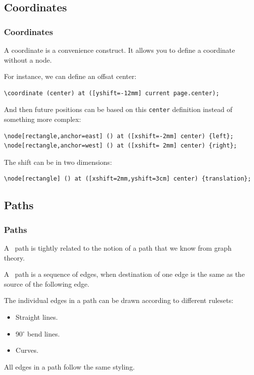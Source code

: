 \subsection{Coordinates}
\begin{frame}[fragile]
  \frametitle{Coordinates}
  \pause
  \vspace{3mm}
  A coordinate is a convenience construct. It allows you to define a coordinate without a node.
  
  \pause
  \vspace{5mm}
  For instance, we can define an offsat center:
  \begin{verbatim}
\coordinate (center) at ([yshift=-12mm] current page.center);
  \end{verbatim}
  
  \pause
  \vspace{5mm}
  And then future positions can be based on this \texttt{center} definition instead of something more complex:
  \begin{verbatim}
\node[rectangle,anchor=east] () at ([xshift=-2mm] center) {left};
\node[rectangle,anchor=west] () at ([xshift= 2mm] center) {right};
  \end{verbatim}
  
  \pause
  \vspace{5mm}
  The shift can be in two dimensions:
  \begin{verbatim}
\node[rectangle] () at ([xshift=2mm,yshift=3cm] center) {translation};
  \end{verbatim}
\end{frame}

\subsection{Paths}
\begin{frame}[fragile]
  \frametitle{Paths}
  \pause
  \vspace{3mm}
  A \TikZ\ path is tightly related to the notion of a path that we know from graph theory.
  
  \pause
  \vspace{5mm}
  A \TikZ\ path is a sequence of edges, when destination of one edge is the same as the source of the following edge.
  
  \vspace{5mm}
  The individual edges in a path can be drawn according to different rulesets:
  \begin{itemize}
    \item Straight lines.
    \item 90$^\circ$ bend lines.
    \item Curves.
  \end{itemize}
  
  \vspace{5mm}
  All edges in a path follow the same styling.
\end{frame}

